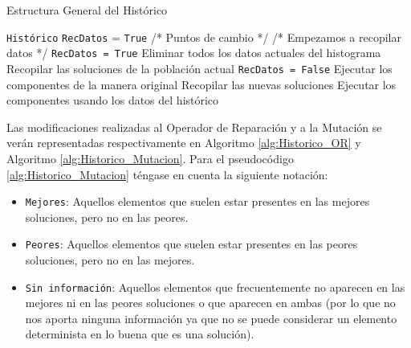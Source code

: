 \begin{algorithm}[H]
\caption{Estructura General del Histórico}\label{alg:Historico_Estructura}
\begin{algorithmic}[1]
\Procedure \texttt{Histórico}
\State \texttt{RecDatos} = \texttt{True}
	 /* Puntos de cambio */
		 /* Empezamos a recopilar datos */
			\State \texttt{RecDatos = True}
			\State Eliminar todos los datos actuales del histograma
			\State Recopilar las soluciones de la población actual
		\Else
			\State \texttt{RecDatos = False}
		\EndIf
	\EndIf
		\State Ejecutar los componentes de la manera original
		\State Recopilar las nuevas soluciones
	\Else 
		\State Ejecutar los componentes usando los datos del histórico
	\EndIf
\EndFor
\EndProcedure
\end{algorithmic}
\end{algorithm}

Las modificaciones realizadas al Operador de Reparación y a la Mutación se verán representadas respectivamente en Algoritmo \ref{alg:Historico_OR} y Algoritmo \ref{alg:Historico_Mutacion}. 
Para el pseudocódigo \ref{alg:Historico_Mutacion} téngase en cuenta la siguiente notación:
\begin{itemize}
	\item \texttt{Mejores}: Aquellos elementos que suelen estar presentes en las mejores soluciones, pero no en las peores.
	\item \texttt{Peores}: Aquellos elementos que suelen estar presentes en las peores soluciones, pero no en las mejores. 
	\item \texttt{Sin información}: Aquellos elementos que frecuentemente no aparecen en las mejores ni en las peores soluciones o que aparecen en ambas (por lo que no nos aporta ninguna información ya que no se puede considerar un elemento determinista en lo buena que es una solución).
\end{itemize}

